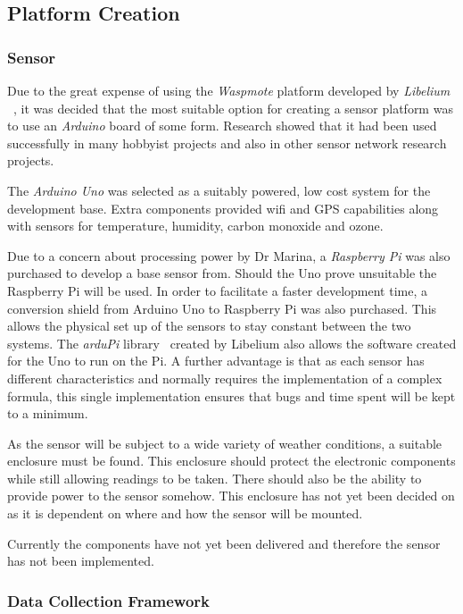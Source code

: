 \subsection{Platform Creation}\label{platformcreation}

\subsubsection{Sensor}\label{sensor}

Due to the great expense of using the \emph{Waspmote} platform developed by \emph{Libelium} ~\cite{waspmote}, it was decided that the most suitable option for creating a sensor platform was to use an \emph{Arduino} board of some form. Research showed that it had been used successfully in many hobbyist projects and also in other sensor network research projects.~\cite{arduinoproj1}~\cite{arduinoproj2}~\cite{arduinoproj3} 

The \emph{Arduino Uno} was selected as a suitably powered, low cost system for the development base. Extra components provided wifi and GPS capabilities along with sensors for temperature, humidity, carbon monoxide and ozone. 

Due to a concern about processing power by Dr Marina, a \emph{Raspberry Pi} was also purchased to develop a base sensor from. Should the Uno prove unsuitable the Raspberry Pi will be used. In order to facilitate a faster development time, a conversion shield from Arduino Uno to Raspberry Pi was also purchased. This allows the physical set up of the sensors to stay constant between the two systems. The \emph{arduPi} library~\cite{ardupi} created by Libelium also allows the software created for the Uno to run on the Pi. A further advantage is that as each sensor has different characteristics and normally requires the implementation of a complex formula, this single implementation ensures that bugs and time spent will be kept to a minimum. 

As the sensor will be subject to a wide variety of weather conditions, a suitable enclosure must be found. This enclosure should protect the electronic components while still allowing readings to be taken. There should also be the ability to provide power to the sensor somehow. This enclosure has not yet been decided on as it is dependent on where and how the sensor will be mounted. 

Currently the components have not yet been delivered and therefore the sensor has not been implemented. 

\subsubsection{Data Collection Framework}\label{datacollectionframework}

